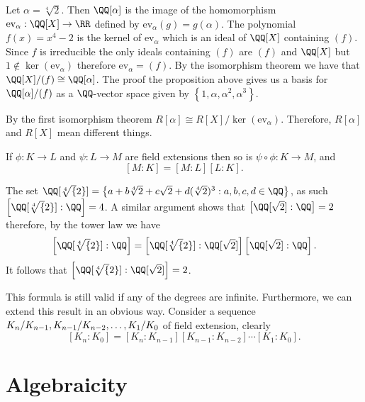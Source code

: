 \documentclass[12pt, a4paper]{article}
\begin{document}
\begin{mdexample}
    Let \(\alpha=\sqrt[4]{2}\). Then \(\QQ[\alpha]\) is the image of the homomorphism \(\text{ev}_{\alpha}:\QQ[X] \to \RR\) defined by \(\text{ev}_{\alpha}(g)=g(\alpha)\). The polynomial \(f(x)=x^4-2\) is the kernel of \(\text{ev}_{\alpha}\) which is an ideal of \(\QQ[X]\) containing \((f)\). Since \(f\) is irreducible the only ideals containing \((f)\) are \((f)\) and \(\QQ[X]\) but \(1 \not\in \ker(\text{ev}_{\alpha})\) therefore \(\text{ev}_{\alpha}=(f)\). By the isomorphism theorem we have that \(\QQ[X]/(f)\cong \QQ[\alpha]\). The proof the proposition above gives us a basis for \(\QQ[\alpha]/(f)\) as a \(\QQ\)-vector space given by \(\left\{ 1,\alpha,\alpha^2,\alpha^3 \right\}\).
\end{mdexample}

\begin{mdremark}
    By the first isomorphism theorem \(R[\alpha]\cong R[X]/\ker(\text{ev}_{\alpha})\). Therefore, \(R[\alpha]\) and \(R[X]\) mean different things.
\end{mdremark}

\begin{mdthm}
    If \(\phi:K \to L\) and \(\psi:L \to M\) are field extensions then so is \(\psi \circ \phi: K\to M\), and 
    \[[M:K]=[M:L][L:K].\]
\end{mdthm}

\begin{mdexample}
    The set \(\QQ[\sqrt[4]{2}] = \left\{ a+b\sqrt[4]{2}+c\sqrt{2} +d(\sqrt[4]{2})^3 : a,b,c,d\in \QQ\right\}\), as such \(\left[ \QQ[\sqrt[4]{2}]:\QQ \right]=4\). A similar argument shows that \(\left[ \QQ[\sqrt{2}]:\QQ \right]=2\) therefore, by the tower law we have 
    \[\left[ \QQ[\sqrt[4]{2}]:\QQ \right]=\left[ \QQ[\sqrt[4]{2}]:\QQ[\sqrt{2}] \right]\left[ \QQ[\sqrt{2}]:\QQ \right].\]
    It follows that \(\left[ \QQ[\sqrt[4]{2}]:\QQ[\sqrt{2}] \right]=2\).
\end{mdexample}

\begin{mdremark}
    This formula is still valid if any of the degrees are infinite. Furthermore, we can extend this result in an obvious way. Consider a sequence \(K_n/K_{n-1},K_{n-1}/K_{n-2},\ldots,\\K_1/K_0\) of field extension, clearly 
    \[[K_n:K_0]=[K_n:K_{n-1}][K_{n-1}:K_{n-2}]\cdots[K_1:K_0].\]
\end{mdremark}

\section{Algebraicity}
\end{document}
